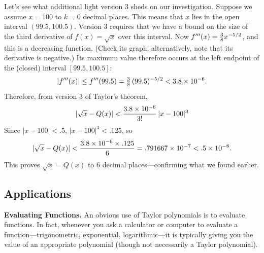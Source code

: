 {{{{        Let's see what additional light version 3 
sheds on our investigation.  Suppose we assume $x = 100$ to $k = 0$ decimal places.  This means that $x$ lies in the open interval $(99.5, 100.5)$.    Version 3 requires that we have a bound on the size of the third derivative of $f(x) = \sqrt{x}$ over this interval.  Now $f'''(x) = {3 \over 8} x^{-5/2}$, and this is a decreasing function.  (Check its graph; alternatively, note that its derivative is negative.)  Its maximum value therefore occurs at the left endpoint of the (closed) interval $[99.5, 100.5]$:
        \[
|f'''(x)| \leq f'''(99.5) = {\textstyle {3 \over 8}} \, (99.5)^{-5/2}
                < 3.8 \times 10^{-6}.
\]
Therefore, from version 3 of Taylor's theorem,
        \[
|\sqrt{x} - Q(x)| < {3.8 \times 10^{-6} \over 3!} \, |x - 100|^3
\]
Since $|x - 100| < .5$, $|x - 100|^3 < .125$, so
        \[
|\sqrt{x} - Q(x)| < {3.8 \times 10^{-6} \times .125 \over 6} = 
                .791667 \times 10^{-7} < .5 \times 10^{-6}.
\]
This proves $\sqrt{x} = Q(x)$ to 6 decimal places---confirming what we found earlier.





\subsection{Applications}


{\bf Evaluating Functions.}  An obvious use 
of Taylor polynomials is to evaluate functions.  In fact, whenever you
ask a calculator or computer to evaluate a function---trigonometric,
exponential, logarithmic---it is typically giving you the value of an
appropriate polynomial (though not necessarily a Taylor polynomial).

\medskip



}}}}
